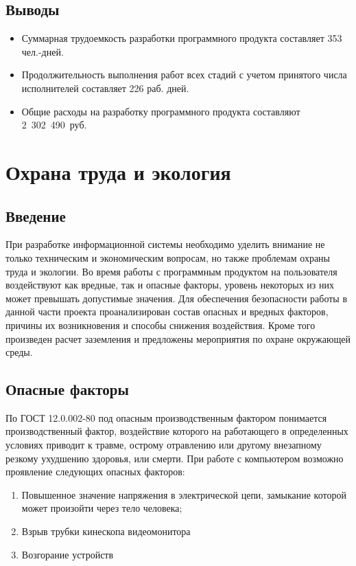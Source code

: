 \documentclass[14pt,oneside,final]{extreport}
\begin{document}
	\section{Выводы}		
		\begin{itemize}
			\item Суммарная трудоемкость разработки программного продукта составляет 353 чел.-дней.
			\item Продолжительность выполнения работ всех стадий с учетом принятого числа исполнителей составляет 226 раб. дней.
			\item Общие расходы на разработку программного продукта составляют \mbox{2 302 490 руб.}
		\end{itemize}

	\chapter{Охрана труда и экология}
	\section{Введение}
	При разработке информационной системы необходимо уделить внимание не только техническим и экономическим вопросам, но также  проблемам охраны труда и экологии. Во время работы с программным продуктом на пользователя воздействуют как вредные, так и опасные факторы, уровень некоторых из них может превышать допустимые значения. Для обеспечения безопасности работы в данной части проекта проанализирован состав опасных и вредных факторов, причины их возникновения и способы снижения воздействия. Кроме того произведен расчет заземления и предложены мероприятия по охране окружающей среды.
	
	\section{Опасные факторы}
	По ГОСТ 12.0.002-80 под опасным производственным фактором понимается производственный фактор, воздействие которого на работающего в определенных условиях приводит к травме, острому отравлению или другому внезапному резкому ухудшению здоровья, или смерти. При работе с компьютером возможно проявление следующих опасных факторов:
	\begin{enumerate}
		\item Повышенное значение напряжения в электрической цепи, замыкание которой может произойти через тело человека;
		\item Взрыв трубки кинескопа видеомонитора
		\item Возгорание устройств 
	\end{enumerate}
	
\end{document}
